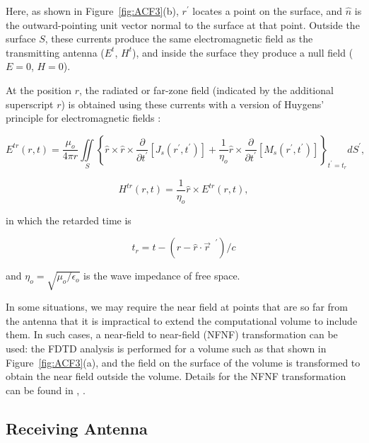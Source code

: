 \noindent Here, as shown in Figure~\ref{fig:ACF3}(b), $r^\prime$ locates a point on the surface, and $\hat{n}$ is the outward-pointing unit vector normal to the surface at that point.  Outside the surface $S$, these currents produce the same electromagnetic field as the transmitting antenna ($E^t$, $H^t$), and inside the surface they produce a null field ($E=0$, $H=0$).

At the position $r$, the radiated or far-zone field (indicated by the additional superscript $r$) is obtained using these currents with a version of Huygens' principle for electromagnetic fields \cite{SmithBook}:

\begin{equation}
E^{tr}(r,t) = \frac{\mu_o}{4\pi r} \iint \limits_S  \left\{  \hat{r} \times \hat{r} \times \frac{\partial}{\partial t^\prime} \left[ J_s(r^\prime,t^\prime) \right]  + \frac{1}{\eta_o}\hat{r} \times \frac{\partial}{\partial t^\prime} \left[ M_s(r^\prime,t^\prime) \right] \right\}_{t^\prime = t_r} dS^\prime ,
\label{eqn:ACE6}
\end{equation}

\begin{equation}
H^{tr}(r,t) =  \frac{1}{\eta_o}\hat{r} \times E^{tr}(r,t) ,
\label{eqn:ACE7}
\end{equation}

\noindent in which the retarded time is

\begin{equation}
t_r = t-(r-\hat{r}\cdot\vec{r}^{\text{ }\prime}) / c
\label{eqn:ACE8}
\end{equation}

\noindent and $\eta_o = \sqrt{\mu_o /  \epsilon_o}$ is the wave impedance of free space.

In some situations, we may require the near field at points that are so far from the antenna that it is impractical to extend the computational volume to include them.  In such cases, a near-field to near-field (NFNF) transformation can be used: the FDTD analysis is performed for a volume such as that shown in Figure~\ref{fig:ACF3}(a), and the field on the surface of the volume is transformed to obtain the near field outside the volume.  Details for the NFNF transformation can be found in \cite{Shlager94}, \cite{Shlager95}.

\subsection{Receiving Antenna}

